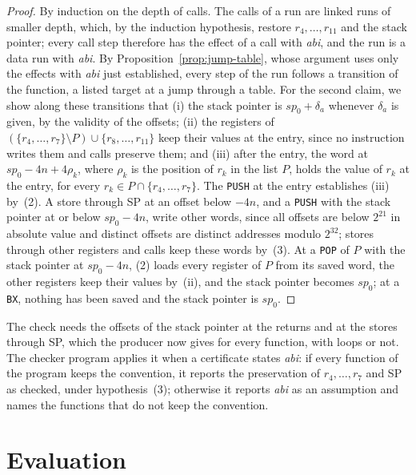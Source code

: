 \documentclass[oneside,english]{amsart}
\numberwithin{equation}{section}
\theoremstyle{plain}
\theoremstyle{definition}
\theoremstyle{plain}
\theoremstyle{plain}
\theoremstyle{remark}
\begin{document}
\begin{proof}
By induction on the depth of calls. The calls of a run are linked runs of smaller depth, which, by the induction hypothesis, restore $r_4, \dots, r_{11}$ and the stack pointer; every call step therefore has the effect of a call with \emph{abi}, and the run is a data run with \emph{abi}. By Proposition~\ref{prop:jump-table}, whose argument uses only the effects with \emph{abi} just established, every step of the run follows a transition of the function, a listed target at a jump through a table. For the second claim, we show along these transitions that (i) the stack pointer is $\mathit{sp}_0 + \delta_a$ whenever $\delta_a$ is given, by the validity of the offsets; (ii) the registers of $(\{r_4, \dots, r_7\} \setminus P) \cup \{r_8, \dots, r_{11}\}$ keep their values at the entry, since no instruction writes them and calls preserve them; and (iii) after the entry, the word at $\mathit{sp}_0 - 4n + 4\rho_k$, where $\rho_k$ is the position of $r_k$ in the list $P$, holds the value of $r_k$ at the entry, for every $r_k \in P \cap \{r_4, \dots, r_7\}$. The \texttt{PUSH} at the entry establishes (iii) by~(2). A store through SP at an offset below $-4n$, and a \texttt{PUSH} with the stack pointer at or below $\mathit{sp}_0 - 4n$, write other words, since all offsets are below $2^{21}$ in absolute value and distinct offsets are distinct addresses modulo $2^{32}$; stores through other registers and calls keep these words by~(3). At a \texttt{POP} of $P$ with the stack pointer at $\mathit{sp}_0 - 4n$, (2) loads every register of $P$ from its saved word, the other registers keep their values by~(ii), and the stack pointer becomes $\mathit{sp}_0$; at a \texttt{BX}, nothing has been saved and the stack pointer is $\mathit{sp}_0$.
\end{proof}

The check needs the offsets of the stack pointer at the returns and at the stores through SP, which the producer now gives for every function, with loops or not. The checker program applies it when a certificate states \emph{abi}: if every function of the program keeps the convention, it reports the preservation of $r_4, \dots, r_7$ and SP as checked, under hypothesis~(3); otherwise it reports \emph{abi} as an assumption and names the functions that do not keep the convention.

\section{Evaluation}
\label{sec:evaluation}
\end{document}
